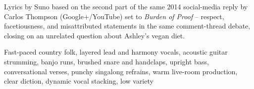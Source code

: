 
\begin{notes}
Lyrics by Suno based on the second part of the same 2014 social-media reply by Carlos Thompson (Google+/YouTube) set to \emph{Burden of Proof} -- respect, facetiousness, and misattributed statements in the same comment-thread debate, closing on an unrelated question about Ashley's vegan diet.
\end{notes}
\begin{style}
Fast-paced country folk, layered lead and harmony vocals, acoustic guitar strumming, banjo runs, brushed snare and handclaps, upright bass, conversational verses, punchy singalong refrains, warm live-room production, clear diction, dynamic vocal stacking, low variety
\end{style}
